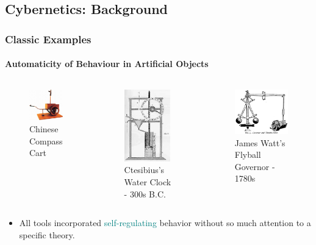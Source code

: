 	\subsection{Cybernetics: Background}
		\begin{frame}
		\frametitle{Classic Examples}
		\framesubtitle{Automaticity of Behaviour in Artificial Objects}
			\begin{columns}
				\begin{figure}
					\includegraphics[width=3cm]{./resources/chinesecompasscart.jpg}
					\caption{Chinese Compass Cart}
				\end{figure}
				\begin{figure}
					\includegraphics[width=2cm]{./resources/waterclock.jpg}
					\caption{Ctesibius's Water Clock - 300s B.C.}
				\end{figure}
				\begin{figure}
					\includegraphics[width=3.5cm]{./resources/flyball.png}
					\caption{James Watt's Flyball Governor - 1780s}
				\end{figure}
			\end{columns}
			\begin{itemize}
				\item<1->All tools incorporated \textcolor{teal}{self-regulating} behavior without so much attention to a specific theory.
			\end{itemize}
		\end{frame}
		
